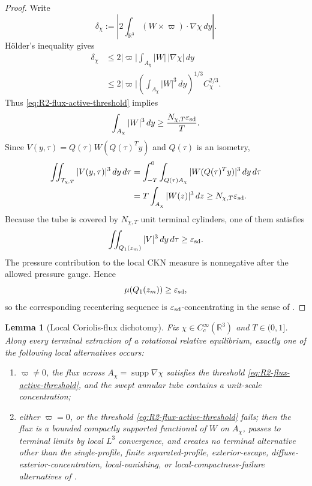 \documentclass[11pt]{amsart}
\numberwithin{equation}{section}
\theoremstyle{plain}
\newtheorem{lemma}[theorem]{Lemma}
\theoremstyle{definition}
\theoremstyle{remark}
\newcommand{\eps}{\varepsilon}
\begin{document}
\begin{proof}
Write
\[
   \delta_\chi:=
   \left|
      2\int_{\mathbb R^3}(W\times\varpi)\cdot\nabla\chi\,dy
   \right| .
\]
H\"older's inequality gives
\[
\begin{aligned}
   \delta_\chi
   &\le
   2|\varpi|\int_{A_\chi}|W|\,|\nabla\chi|\,dy  \\
   &\le
   2|\varpi|
   \left(\int_{A_\chi}|W|^3\,dy\right)^{1/3}
   C_\chi^{2/3}.
\end{aligned}
\]
Thus \eqref{eq:R2-flux-active-threshold} implies
\[
   \int_{A_\chi}|W|^3\,dy\ge \frac{N_{\chi,T}\eps_{\rm sd}}{T}.
\]
Since \(V(y,\tau)=Q(\tau)W(Q(\tau)^Ty)\) and \(Q(\tau)\) is an isometry,
\[
\begin{aligned}
   \iint_{\mathcal T_{\chi,T}} |V(y,\tau)|^3\,dy\,d\tau
   &=
   \int_{-T}^{0}\int_{Q(\tau)A_\chi}
      |W(Q(\tau)^Ty)|^3\,dy\,d\tau \\
   &=
   T\int_{A_\chi}|W(z)|^3\,dz
   \ge N_{\chi,T}\eps_{\rm sd}.
\end{aligned}
\]
Because the tube is covered by \(N_{\chi,T}\) unit terminal cylinders, one of
them satisfies
\[
   \iint_{Q_1(z_m)} |V|^3\,dy\,d\tau\ge \eps_{\rm sd}.
\]
The pressure contribution to the local CKN measure is nonnegative after the
allowed pressure gauge.  Hence
\[
   \mu(Q_1(z_m))\ge \eps_{\rm sd},
\]
so the corresponding recentering sequence is \(\eps_{\rm sd}\)-concentrating in the sense of
.
\end{proof}

\begin{lemma}[Local Coriolis-flux dichotomy]
\label{lem:R2-flux-routing-dichotomy}
Fix \(\chi\in C_c^\infty(\mathbb R^3)\) and \(T\in(0,1]\).  Along every
terminal extraction of a rotational relative equilibrium, exactly one of the
following local alternatives occurs:
\begin{enumerate}[label=(\roman*)]
   \item \(\varpi\ne0\), the flux across
   \(A_\chi=\operatorname{supp}\nabla\chi\) satisfies the threshold
   \eqref{eq:R2-flux-active-threshold}, and the swept annular tube contains a
   unit-scale concentration;
   \item either \(\varpi=0\), or the threshold
   \eqref{eq:R2-flux-active-threshold} fails; then the flux is a bounded
   compactly supported functional of \(W\) on \(A_\chi\), passes to terminal
   limits by local \(L^3\) convergence, and creates no terminal alternative other than
   the single-profile, finite separated-profile, exterior-escape,
   diffuse-exterior-concentration, local-vanishing, or
   local-compactness-failure alternatives of
   .
\end{enumerate}
\end{lemma}
\end{document}
